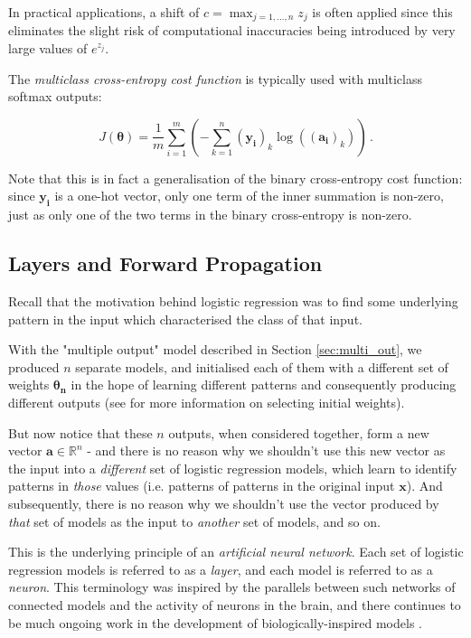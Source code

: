 \documentclass{article}[11pt]
\begin{document}
        In practical applications, a shift of $c = \max_{j = 1, \ldots, n} z_j$ is often applied since this eliminates the slight risk of computational inaccuracies being introduced by very large values of $e^{z_j}$.
        
        The \textit{multiclass cross-entropy cost function} is typically used with multiclass softmax outputs:
        
        $$
        J(\boldsymbol{\theta}) = \frac{1}{m} \sum_{i=1}^{m} \left( - \sum_{k=1}^{n} (\mathbf{y_i})_k \log(\mathbf{(a_i)}_k) \right) \,.
        $$
        
        Note that this is in fact a generalisation of the binary cross-entropy cost function: since $\mathbf{y_i}$ is a one-hot vector, only one term of the inner summation is non-zero, just as only one of the two terms in the binary cross-entropy is non-zero.
        
        
        
    
    \subsection{Layers and Forward Propagation}
        
        
        Recall that the motivation behind logistic regression was to find some underlying pattern in the input which characterised the class of that input.
        
        With the "multiple output" model described in Section \ref{sec:multi_out}, we produced $n$ separate models, and initialised each of them with a different set of weights $\boldsymbol{\theta_n}$ in the hope of learning different patterns and consequently producing different outputs (see \cite{lecun_backprop} for more information on selecting initial weights).
        
        But now notice that these $n$ outputs, when considered together, form a new vector $\mathbf{a} \in \mathbb{R}^n$ - and there is no reason why we shouldn't use this new vector as the input into a \textit{different} set of logistic regression models, which learn to identify patterns in \textit{those} values (i.e. patterns of patterns in the original input $\mathbf{x}$). And subsequently, there is no reason why we shouldn't use the vector produced by \textit{that} set of models as the input to \textit{another} set of models, and so on.
        
        This is the underlying principle of an \textit{artificial neural network}. Each set of logistic regression models is referred to as a \textit{layer}, and each model is referred to as a \textit{neuron}. This terminology was inspired by the parallels between such networks of connected models and the activity of neurons in the brain, and there continues to be much ongoing work in the development of biologically-inspired models \cite{bionets}.
        
\end{document}
